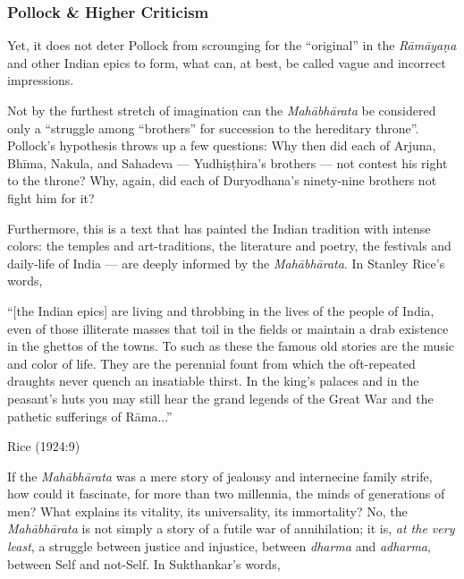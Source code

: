 \subsubsection{Pollock \& Higher Criticism}\label{sec1.1.1.2}

Yet, it does not deter Pollock from scrounging for the “original” in the {\sl Rāmāyaṇa} and other Indian epics to form, what can, at best, be called vague and incorrect impressions. 

Not by the furthest stretch of imagination can the {\sl Mahābhārata} be considered only a “struggle among “brothers” for succession to the hereditary throne”. Pollock’s hypothesis throws up a few questions: Why then did each of Arjuna, Bhīma, Nakula, and Sahadeva --- Yudhiṣṭhira’s brothers --- not contest his right to the throne? Why, again, did each of Duryodhana’s ninety-nine brothers not fight him for it? 

Furthermore, this is a text that has painted the Indian tradition with intense colors: the temples and art-traditions, the literature and poetry, the festivals and daily-life of India --- are deeply informed by the {\sl Mahābhārata}. In Stanley Rice’s words,

\begin{myquote}
“[the Indian epics] are living and throbbing in the lives of the people of India, even of those illiterate masses that toil in the fields or maintain a drab existence in the ghettos of the towns. To such as these the famous old stories are the music and color of life. They are the perennial fount from which the oft-repeated draughts never quench an insatiable thirst. In the king's palaces and in the peasant's huts you may still hear the grand legends of the Great War and the pathetic sufferings of Rāma...”

\hfill Rice (1924:9)
\end{myquote}

If the {\sl Mahābhārata} was a mere story of jealousy and internecine family strife, how could it fascinate, for more than two millennia, the minds of generations of men? What explains its vitality, its universality, its immortality? No, the {\sl Mahābhārata} is not simply a story of a futile war of annihilation; it is, {\sl at the very least}, a struggle between justice and injustice, between {\sl dharma} and {\sl adharma}, between Self and not-Self. In Sukthankar’s words,

